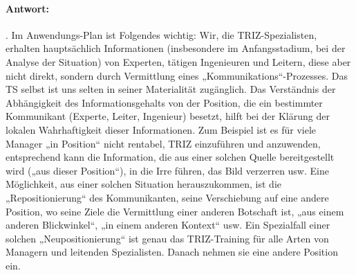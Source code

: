 \documentclass[11pt,a4paper]{article}
\begin{document}
\paragraph {Antwort:}.
Im Anwendungs-Plan ist Folgendes wichtig: Wir, die TRIZ-Spezialisten, erhalten
hauptsächlich Informationen (insbesondere im Anfangsstadium, bei der Analyse
der Situation) von Experten, tätigen Ingenieuren und Leitern, diese aber nicht
direkt, sondern durch Vermittlung eines „Kommunikations“-Prozesses. Das TS
selbst ist uns selten in seiner Materialität zugänglich.  Das Verständnis der
Abhängigkeit des Informationsgehalts von der Position, die ein bestimmter
Kommunikant (Experte, Leiter, Ingenieur) besetzt, hilft bei der Klärung der
lokalen Wahrhaftigkeit dieser Informationen. Zum Beispiel ist es für viele
Manager „in Position“ nicht rentabel, TRIZ einzuführen und anzuwenden,
entsprechend kann die Information, die aus einer solchen Quelle bereitgestellt
wird („aus dieser Position“), in die Irre führen, das Bild verzerren usw.
Eine Möglichkeit, aus einer solchen Situation herauszukommen, ist die
„Repositionierung“ des Kommunikanten, seine Verschiebung auf eine andere
Position, wo seine Ziele die Vermittlung einer anderen Botschaft ist, „aus
einem anderen Blickwinkel“, „in einem anderen Kontext“ usw. Ein Spezialfall
einer solchen „Neupositionierung“ ist genau das TRIZ-Training für alle Arten
von Managern und leitenden Spezialisten. Danach nehmen sie eine andere
Position ein.
\end{document}
